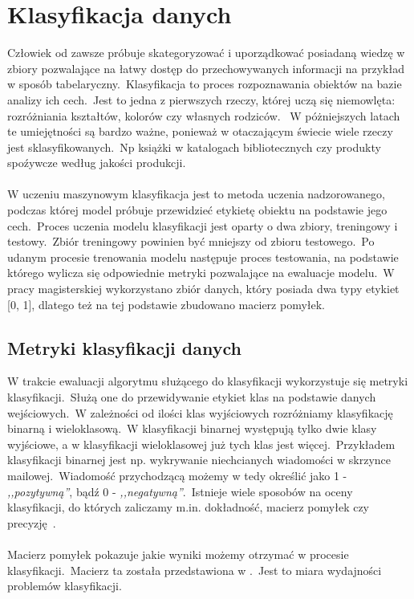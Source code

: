 \chapter{Klasyfikacja danych}

 Człowiek od zawsze próbuje skategoryzować i uporządkować posiadaną wiedzę w zbiory pozwalające na łatwy dostęp do przechowywanych informacji na przykład w sposób tabelaryczny.\ Klasyfikacja to proces rozpoznawania obiektów na bazie analizy ich cech.\ Jest to jedna z pierwszych rzeczy, której uczą się niemowlęta: rozróżniania kształtów, kolorów czy własnych rodziców. \ W póżniejszych latach te umiejętności są bardzo ważne, ponieważ w otaczającym świecie wiele rzeczy jest sklasyfikowanych.\ Np książki w katalogach bibliotecznych czy produkty spoźywcze według jakości produkcji.
\\ \\
W uczeniu maszynowym klasyfikacja jest to metoda uczenia nadzorowanego, podczas której model próbuje przewidzieć etykietę obiektu na podstawie jego cech.\ Proces uczenia modelu klasyfikacji jest oparty o dwa zbiory, treningowy i testowy.\ Zbiór treningowy powinien być mniejszy od zbioru testowego.\ Po udanym procesie trenowania modelu następuje proces testowania, na podstawie którego wylicza się odpowiednie metryki pozwalające na ewaluacje modelu.\ W pracy magisterskiej wykorzystano zbiór danych, który posiada dwa typy etykiet [0, 1], dlatego też na tej podstawie zbudowano macierz pomyłek.

\section{Metryki klasyfikacji danych}
W trakcie ewaluacji algorytmu służącego do klasyfikacji wykorzystuje się metryki klasyfikacji.\ Służą one do przewidywanie etykiet klas na podstawie danych wejściowych.\ W zależności od ilości klas wyjściowych rozróżniamy klasyfikację binarną i wieloklasową.\ W klasyfikacji binarnej występują tylko dwie klasy wyjściowe, a w klasyfikacji wieloklasowej już tych klas jest więcej.\ Przykładem klasyfikacji binarnej jest np. wykrywanie niechcianych wiadomości w skrzynce mailowej.\ Wiadomość przychodzącą możemy w tedy określić jako 1 - \textit{,,pozytywną''}, bądź 0 - \textit{,,negatywną''}.\ Istnieje wiele sposobów na oceny klasyfikacji, do których zaliczamy m.in. dokładność, macierz pomyłek czy precyzję~\cite{Agrawal2024}.
\\ \\
Macierz pomyłek pokazuje jakie wyniki możemy otrzymać w procesie klasyfikacji.\ Macierz ta została przedstawiona w .\ Jest to miara wydajności problemów klasyfikacji.

